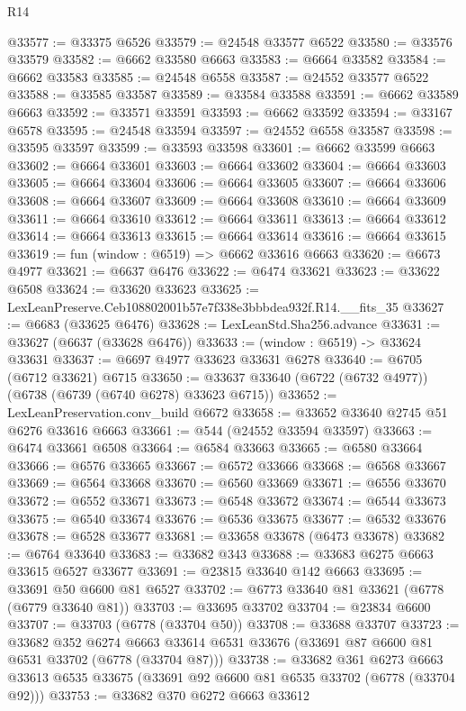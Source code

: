 \begin{lexlean}{R14}
\begin{coremodule}
@33577 := @33375 @6526
@33579 := @24548 @33577 @6522
@33580 := @33576 @33579
@33582 := @6662 @33580 @6663
@33583 := @6664 @33582
@33584 := @6662 @33583
@33585 := @24548 @6558
@33587 := @24552 @33577 @6522
@33588 := @33585 @33587
@33589 := @33584 @33588
@33591 := @6662 @33589 @6663
@33592 := @33571 @33591
@33593 := @6662 @33592
@33594 := @33167 @6578
@33595 := @24548 @33594
@33597 := @24552 @6558 @33587
@33598 := @33595 @33597
@33599 := @33593 @33598
@33601 := @6662 @33599 @6663
@33602 := @6664 @33601
@33603 := @6664 @33602
@33604 := @6664 @33603
@33605 := @6664 @33604
@33606 := @6664 @33605
@33607 := @6664 @33606
@33608 := @6664 @33607
@33609 := @6664 @33608
@33610 := @6664 @33609
@33611 := @6664 @33610
@33612 := @6664 @33611
@33613 := @6664 @33612
@33614 := @6664 @33613
@33615 := @6664 @33614
@33616 := @6664 @33615
@33619 := fun (window : @6519) => @6662 @33616 @6663
@33620 := @6673 @4977
@33621 := @6637 @6476
@33622 := @6474 @33621
@33623 := @33622 @6508
@33624 := @33620 @33623
@33625 := LexLeanPreserve.Ceb108802001b57e7f338e3bbbdea932f.R14.__fits_35
@33627 := @6683 (@33625 @6476)
@33628 := LexLeanStd.Sha256.advance
@33631 := @33627 (@6637 (@33628 @6476))
@33633 := (window : @6519) -> @33624 @33631
@33637 := @6697 @4977 @33623 @33631 @6278
@33640 := @6705 (@6712 @33621) @6715
@33650 := @33637 @33640 (@6722 (@6732 @4977)) (@6738 (@6739 (@6740 @6278) @33623 @6715))
@33652 := LexLeanPreservation.conv_build @6672
@33658 := @33652 @33640 @2745 @51 @6276 @33616 @6663
@33661 := @544 (@24552 @33594 @33597)
@33663 := @6474 @33661 @6508
@33664 := @6584 @33663
@33665 := @6580 @33664
@33666 := @6576 @33665
@33667 := @6572 @33666
@33668 := @6568 @33667
@33669 := @6564 @33668
@33670 := @6560 @33669
@33671 := @6556 @33670
@33672 := @6552 @33671
@33673 := @6548 @33672
@33674 := @6544 @33673
@33675 := @6540 @33674
@33676 := @6536 @33675
@33677 := @6532 @33676
@33678 := @6528 @33677
@33681 := @33658 @33678 (@6473 @33678)
@33682 := @6764 @33640
@33683 := @33682 @343
@33688 := @33683 @6275 @6663 @33615 @6527 @33677
@33691 := @23815 @33640 @142 @6663
@33695 := @33691 @50 @6600 @81 @6527
@33702 := @6773 @33640 @81 @33621 (@6778 (@6779 @33640 @81))
@33703 := @33695 @33702
@33704 := @23834 @6600
@33707 := @33703 (@6778 (@33704 @50))
@33708 := @33688 @33707
@33723 := @33682
    @352
    @6274
    @6663
    @33614
    @6531
    @33676
    (@33691 @87 @6600 @81 @6531 @33702 (@6778 (@33704 @87)))
@33738 := @33682
    @361
    @6273
    @6663
    @33613
    @6535
    @33675
    (@33691 @92 @6600 @81 @6535 @33702 (@6778 (@33704 @92)))
@33753 := @33682
    @370
    @6272
    @6663
    @33612

\end{coremodule}
\end{lexlean}
